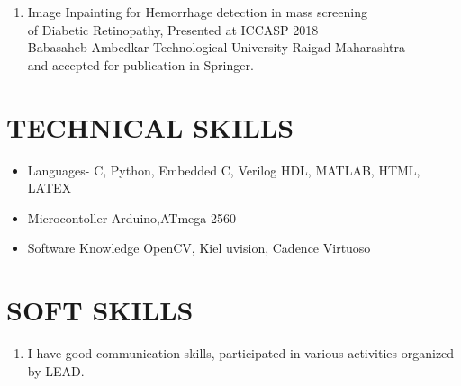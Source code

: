 \documentclass[paper=a4,fontsize=11pt]{scrartcl}
\newcommand{\NewPart}[1]{\section*{\uppercase{#1}}}
\begin{document}
\begin{enumerate}
\item
Image Inpainting for Hemorrhage detection in mass screening \\of Diabetic Retinopathy, Presented at ICCASP 2018 \\
 Babasaheb Ambedkar
Technological University Raigad Maharashtra\\ and accepted for publication in Springer.
\end{enumerate}

\NewPart{Technical Skills}{}
\begin{itemize}
\item  Languages- C, Python, Embedded C, Verilog HDL, MATLAB, HTML, LATEX
\item Microcontoller-Arduino,ATmega 2560

\item Software Knowledge OpenCV, Kiel uvision, Cadence Virtuoso
\end{itemize}
\NewPart{Soft skills}
\begin{enumerate}
\item I have good communication skills, participated in various activities organized by LEAD.
\end{enumerate}
\end{document}
